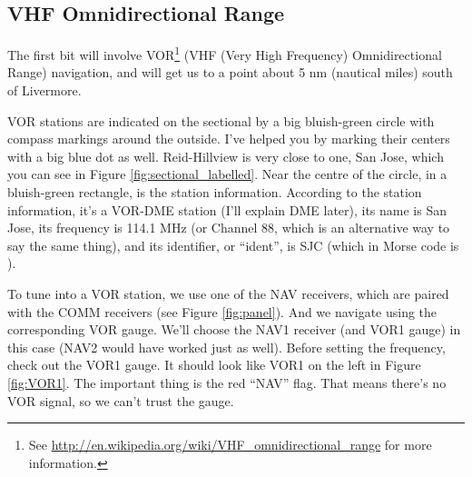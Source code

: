 
\subsection{VHF Omnidirectional Range}

The first bit will involve VOR\footnote{See
  \url{http://en.wikipedia.org/wiki/VHF_omnidirectional_range} for
  more information.} (VHF (Very High Frequency) Omnidirectional Range)
navigation, and will get us to a point about 5 nm (nautical miles)
south of Livermore.

VOR stations are indicated on the sectional by a big bluish-green
circle with compass markings around the outside.  I've helped you by
marking their centers with a big blue dot as well.  Reid-Hillview is
very close to one, San Jose, which you can see in Figure
\ref{fig:sectional_labelled}.  Near the centre of the circle, in a
bluish-green rectangle, is the station information.  According to the
station information, it's a VOR-DME station (I'll explain DME later),
its name is San Jose, its frequency is 114.1 MHz (or Channel 88, which
is an alternative way to say the same thing), and its identifier, or
``ident'', is SJC (which in Morse code is \mdot\mdot\mdot\mspace
\mdot\mdash\mdash\mdash\mspace \mdash\mdot\mdash\mdot).


To tune into a VOR station, we use one of the NAV receivers, which are
paired with the COMM receivers (see Figure \ref{fig:panel}).  And we
navigate using the corresponding VOR gauge.  We'll choose the NAV1
receiver (and VOR1 gauge) in this case (NAV2 would have worked just as
well).  Before setting the frequency, check out the VOR1 gauge.  It
should look like VOR1 on the left in Figure \ref{fig:VOR1}.  The
important thing
is the red ``NAV'' flag.  That means there's no VOR signal, so we
can't trust the gauge.


